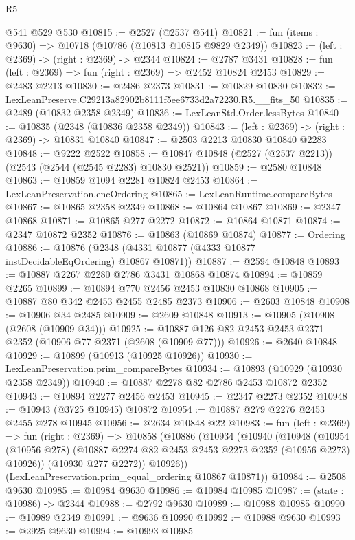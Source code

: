 \begin{lexlean}{R5}
\begin{coremodule}
    @541
    @529
    @530
@10815 := @2527 (@2537 @541)
@10821 := fun (items : @9630) => @10718 (@10786 (@10813 @10815 @9829 @2349))
@10823 := (left : @2369) -> (right : @2369) -> @2344
@10824 := @2787 @3431
@10828 := fun (left : @2369) => fun (right : @2369) => @2452 @10824 @2453
@10829 := @2483 @2213
@10830 := @2486 @2373
@10831 := @10829 @10830
@10832 := LexLeanPreserve.C29213a82902b8111f5ee6733d2a72230.R5.__fits_50
@10835 := @2489 (@10832 @2358 @2349)
@10836 := LexLeanStd.Order.lessBytes
@10840 := @10835 (@2348 (@10836 @2358 @2349))
@10843 := (left : @2369) -> (right : @2369) -> @10831 @10840
@10847 := @2503 @2213 @10830 @10840 @2283
@10848 := @9222 @2522
@10858 := @10847 @10848 (@2527 (@2537 @2213)) (@2543 (@2544 (@2545 @2283) @10830 @2521))
@10859 := @2580 @10848
@10863 := @10859 @1094 @2281 @10824 @2453
@10864 := LexLeanPreservation.encOrdering
@10865 := LexLeanRuntime.compareBytes
@10867 := @10865 @2358 @2349
@10868 := @10864 @10867
@10869 := @2347 @10868
@10871 := @10865 @277 @2272
@10872 := @10864 @10871
@10874 := @2347 @10872 @2352
@10876 := @10863 (@10869 @10874)
@10877 := Ordering
@10886 := @10876 (@2348 (@4331 @10877 (@4333 @10877 instDecidableEqOrdering) @10867 @10871))
@10887 := @2594 @10848
@10893 := @10887 @2267 @2280 @2786 @3431 @10868 @10874
@10894 := @10859 @2265
@10899 := @10894 @770 @2456 @2453 @10830 @10868
@10905 := @10887 @80 @342 @2453 @2455 @2485 @2373
@10906 := @2603 @10848
@10908 := @10906 @34 @2485
@10909 := @2609 @10848
@10913 := @10905 (@10908 (@2608 (@10909 @34)))
@10925 := @10887 @126 @82 @2453 @2453 @2371 @2352 (@10906 @77 @2371 (@2608 (@10909 @77)))
@10926 := @2640 @10848
@10929 := @10899 (@10913 (@10925 @10926))
@10930 := LexLeanPreservation.prim_compareBytes
@10934 := @10893 (@10929 (@10930 @2358 @2349))
@10940 := @10887 @2278 @82 @2786 @2453 @10872 @2352
@10943 := @10894 @2277 @2456 @2453
@10945 := @2347 @2273 @2352
@10948 := @10943 (@3725 @10945) @10872
@10954 := @10887 @279 @2276 @2453 @2455 @278 @10945
@10956 := @2634 @10848 @22
@10983 := fun (left : @2369) =>
  fun (right : @2369) =>
  @10858
    (@10886
      (@10934
        (@10940
          (@10948
            (@10954 (@10956 @278) (@10887 @2274 @82 @2453 @2453 @2273 @2352 (@10956 @2273) @10926))
            (@10930 @277 @2272))
          @10926))
      (LexLeanPreservation.prim_equal_ordering @10867 @10871))
@10984 := @2508 @9630
@10985 := @10984 @9630
@10986 := @10984 @10985
@10987 := (state : @10986) -> @2344
@10988 := @2792 @9630
@10989 := @10988 @10985
@10990 := @10989 @2349
@10991 := @9636 @10990
@10992 := @10988 @9630
@10993 := @2925 @9630
@10994 := @10993 @10985

\end{coremodule}
\end{lexlean}
